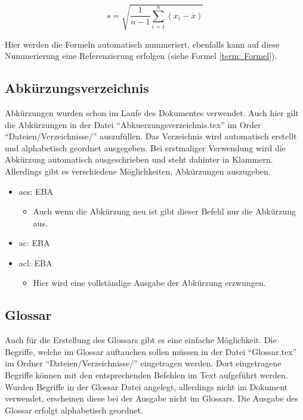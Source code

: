 \begin{equation}\label{term: Formel}
	s = \sqrt{\frac{1}{n - 1} \sum_{i=1}^n (x_i - \overline{x})}
\end{equation}

Hier werden die Formeln automatisch nummeriert, ebenfalls kann auf diese Nummerierung eine Referenzierung erfolgen (siehe Formel \ref{term: Formel}).

\subsection{Abkürzungsverzeichnis}

Abkürzungen wurden schon im Laufe des Dokumentes verwendet. Auch hier gilt die Abkürzungen in der Datei \enquote{Abkuerzungsverzeichnis.tex} im Order \enquote{Dateien/Verzeichnisse/} auszufüllen. Das Verzeichnis wird automatisch erstellt und alphabetisch geordnet ausgegeben. Bei erstmaliger Verwendung wird die Abkürzung automatisch ausgeschrieben und steht dahinter in Klammern. Allerdings gibt es verschiedene Möglichkeiten, Abkürzungen auszugeben.

\begin{itemize}
	\item acs: \acs{EBA}
	\begin{itemize}
		\item Auch wenn die Abkürzung neu ist gibt dieser Befehl nur die Abkürzung aus.
	\end{itemize}
	\item ac: \ac{EBA}
	\item acl: \acl{EBA}
	\begin{itemize}
		\item Hier wird eine vollständige Ausgabe der Abkürzung erzwungen.
	\end{itemize}
\end{itemize}

\subsection{Glossar}

Auch für die Erstellung des \gls{Glossar}s gibt es eine einfache Möglichkeit. Die Begriffe, welche im \gls{Glossar} auftauchen sollen müssen in der Datei \enquote{Glossar.tex} im Ordner \enquote{Dateien/Verzeichnisse/} eingetragen werden. Dort eingetragene Begriffe können mit den entsprechenden Befehlen im Text aufgeführt werden. Wurden Begriffe in der Glossar Datei angelegt, allerdings nicht im Dokument verwendet, erscheinen diese bei der Ausgabe nicht im \gls{Glossar}s. Die Ausgabe des \gls{Glossar} erfolgt alphabetisch geordnet.

